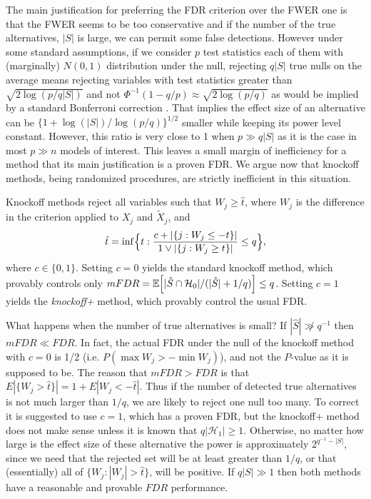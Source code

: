\documentclass[article,lineno]{biometrika}
\begin{document}
	The main justification for preferring the FDR criterion over the FWER one is that the FWER seems to be too conservative and if the number of the true alternatives, $|S|$ is large, we can permit some  false detections. However under some standard assumptions, if we consider $p$ test statistics each of them with (marginally) $N(0,1)$ distribution under the null, rejecting $q|S|$ true nulls on the average means rejecting variables with test statistics greater than $\sqrt{2\log(p/q|S|)}$ and not $\Phi^{-1}(1-q/p)\approx\sqrt{2\log (p/q)}$ as would be implied by a standard Bonferroni correction .
	That implies  the effect size of an alternative can be $\bigl\{1+\log(|S|)/\log (p/q)\bigr\}^{1/2}$ smaller while keeping its power level constant. However, this ratio is very close to 1 when $p\gg q|S|$ as it is the case in most $p\gg n$ models of interest. This leaves a small margin of inefficiency for a method that its main justification is a proven FDR.
	We argue now that knockoff methods, being randomized procedures, are strictly inefficient in this situation.
	
	Knockoff methods reject all variables such that $W_j\ge \hat t$, where $W_j$ is the difference in the criterion applied to $X_j$ and $\tilde X_j$, and
	\begin{equation*}
		\hat t = \inf\Bigl\{t: \frac{c+|\{j: W_j\le -t\}|}{1\vee|\{j: W_j\ge t\}|}\leq q\Bigr\},
	\end{equation*}
	where $c\in\{0,1\}$.
	Setting $c=0$ yields the standard knockoff method, which provably controls only $mFDR=\mathbb{E} \Bigl[|\hat S\cap {\mathcal H}_0|/(|\hat S|+1/q)\Bigr]\le q$.
	Setting $c=1$ yields the \emph{knockoff+} method, which provably control the usual FDR.
	
	What happens when the number of true alternatives is small?
	If $|\hat S|\not\gg q^{-1}$ then $mFDR \ll FDR$.
	In fact, the actual FDR under the null of the knockoff method with $c=0$ is 1/2 (i.e. $P(\max W_j> -\min W_j)$), and not the $P$-value as it is supposed to be. The reason that $mFDR>FDR$ is that $E|\{W_j>\hat t\}|=1+E |W_j<-\hat t|$. Thus if the number of detected true alternatives is not much larger than $1/q$, we are likely to reject one null too many. To correct it is suggested to use $c=1$, which has a proven FDR, but the knockoff+ method does not make sense unless it is known that $q|{\mathcal H}_1|\ge 1$. Otherwise, no matter how large is the effect size of these alternative the power is approximately $2^{q^{-1}-|S|}$, since we need that the rejected set will be at least greater than $1/q$, or that (essentially) all of $\{W_j: |W_j|>\hat t\}$, will be positive.
	If $q|S|\gg 1$ then both methods have a reasonable and provable $FDR$ performance.
	
\end{document}
